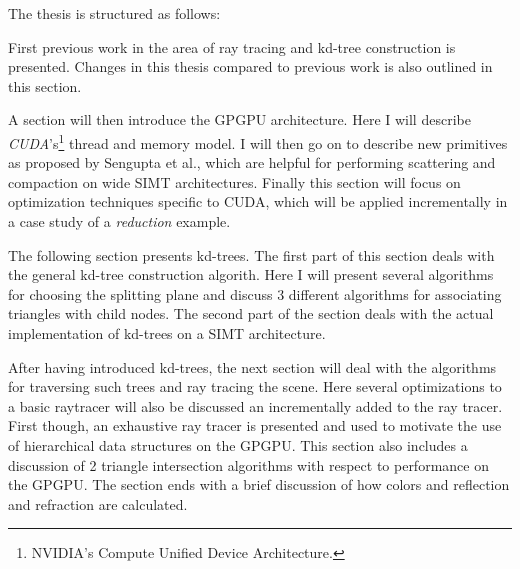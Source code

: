 The thesis is structured as follows:


First previous work in the area of ray tracing and kd-tree
construction is presented. Changes in this thesis compared to previous
work is also outlined in this section.


A section will then introduce the GPGPU architecture. Here I will
describe \textit{CUDA}'s\footnote{NVIDIA's Compute Unified Device
  Architecture.} thread and memory model. I will then go on to
describe new primitives as proposed by Sengupta et
al., which are helpful for performing
scattering and compaction on wide SIMT architectures. Finally this
section will focus on optimization techniques specific to CUDA, which
will be applied incrementally in a case study of a \textit{reduction}
example.


The following section presents kd-trees. The first part of this
section deals with the general kd-tree construction algorith. Here I
will present several algorithms for choosing the splitting plane and
discuss 3 different algorithms for associating triangles with child
nodes. The second part of the section deals with the actual
implementation of kd-trees on a SIMT architecture.


After having introduced kd-trees, the next section will deal with the
algorithms for traversing such trees and ray tracing the scene. Here
several optimizations to a basic raytracer will also be discussed an
incrementally added to the ray tracer. First though, an exhaustive ray
tracer is presented and used to motivate the use of hierarchical data
structures on the GPGPU. This section also includes a discussion of 2
triangle intersection algorithms with respect to performance on the
GPGPU. The section ends with a brief discussion of how colors and
reflection and refraction are calculated.



